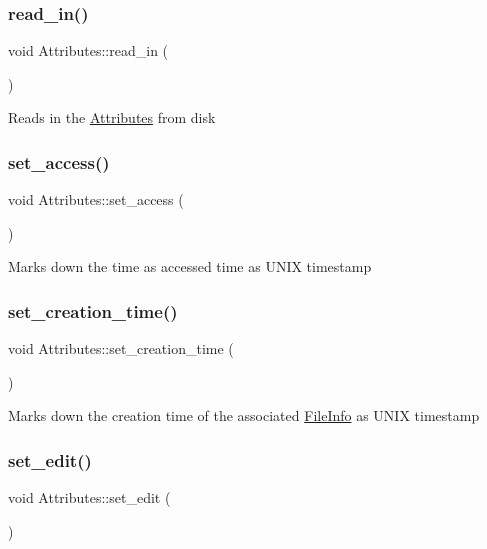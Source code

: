 \subsubsection{\texorpdfstring{read\+\_\+in()}{read\_in()}}
{\footnotesize\ttfamily void Attributes\+::read\+\_\+in (\begin{DoxyParamCaption}{ }\end{DoxyParamCaption})}

Reads in the \mbox{\hyperlink{class_attributes}{Attributes}} from disk \mbox{\label{class_attributes_af2ce6f6dce652a7adfeba3f28b4ee0bc}} 
\subsubsection{\texorpdfstring{set\+\_\+access()}{set\_access()}}
{\footnotesize\ttfamily void Attributes\+::set\+\_\+access (\begin{DoxyParamCaption}{ }\end{DoxyParamCaption})}

Marks down the time as accessed time as U\+N\+IX timestamp \mbox{\label{class_attributes_a4c518dae976d9186337f655f7b09cecc}} 
\subsubsection{\texorpdfstring{set\+\_\+creation\+\_\+time()}{set\_creation\_time()}}
{\footnotesize\ttfamily void Attributes\+::set\+\_\+creation\+\_\+time (\begin{DoxyParamCaption}{ }\end{DoxyParamCaption})}

Marks down the creation time of the associated \mbox{\hyperlink{class_file_info}{File\+Info}} as U\+N\+IX timestamp \mbox{\label{class_attributes_a88674bf65fba99d32870c7fa48edf135}} 
\subsubsection{\texorpdfstring{set\+\_\+edit()}{set\_edit()}}
{\footnotesize\ttfamily void Attributes\+::set\+\_\+edit (\begin{DoxyParamCaption}{ }\end{DoxyParamCaption})}

